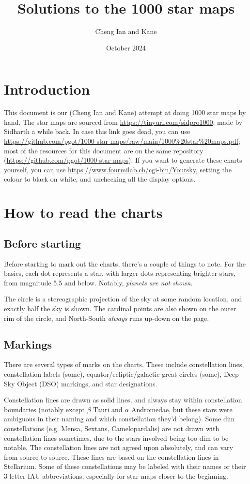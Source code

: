 \documentclass{article}
\title{Solutions to the 1000 star maps}
\author{Cheng Ian and Kane}
\date{October 2024}
\begin{document}
\begin{titlingpage}
\maketitle
\end{titlingpage}

\section{Introduction}
This document is our (Cheng Ian and Kane) attempt at doing 1000 star maps by hand. The star maps are sourced from \url{https://tinyurl.com/sidpro1000}, made by Sidharth a while back. In case this link goes dead, you can use \url{https://github.com/pgot/1000-star-maps/raw/main/1000%20star%20maps.pdf}; most of the resources for this document are on the same repository (\url{https://github.com/pgot/1000-star-maps}). If you want to generate these charts yourself, you can use \url{https://www.fourmilab.ch/cgi-bin/Yoursky}, setting the colour to black on white, and unchecking all the display options.

\section{How to read the charts}
\subsection{Before starting}
Before starting to mark out the charts, there's a couple of things to note. For the basics, each dot represents a star, with larger dots representing brighter stars, from magnitude 5.5 and below. Notably, \textit{planets are not shown.}

The circle is a stereographic projection of the sky at some random location, and exactly half the sky is shown. The cardinal points are also shown on the outer rim of the circle, and North-South \textit{always} runs up-down on the page.
\subsection{Markings}
There are several types of marks on the charts. These include constellation lines, constellation labels (some), equator/ecliptic/galactic great circles (some), Deep Sky Object (DSO) markings, and star designations.

Constellation lines are drawn as solid lines, and always stay within constellation boundaries (notably except \(\beta\) Tauri and \(\alpha\) Andromedae, but these stars were ambiguous in their naming and which constellation they'd belong). Some dim constellations (e.g. Mensa, Sextans, Camelopardalis) are not drawn with constellation lines sometimes, due to the stars involved being too dim to be notable. The constellation lines are not agreed upon absolutely, and can vary from source to source. These lines are based on the constellation lines in Stellarium. Some of these constellations may be labeled with their names or their 3-letter IAU abbreviations, especially for star maps closer to the beginning.
\end{document}

